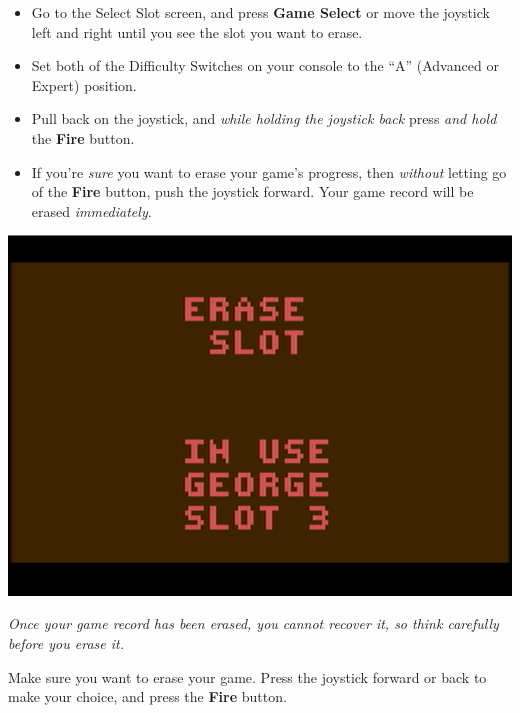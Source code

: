 \documentclass[10pt,twocolumn,openany,article]{memoir}
\newenvironment{ritemize}{\begin{itemize}\raggedright}{\end{itemize}}
\begin{document}
\begin{ritemize}
\item Go  to the Select Slot  screen, and press \textbf{Game  Select} or
  move  the joystick  left and  right until  you see  the slot  you want
  to erase.
\item Set both  of the Difficulty Switches on your  console to the ``A''
  (Advanced or Expert) position.
\item Pull  back on the  joystick, and \emph{while holding  the joystick
    back} press \emph{and hold} the \textbf{Fire} button.
\item If you're \emph{sure} you want to erase your game's progress, then
  \emph{without}  letting  go  of  the \textbf{Fire}  button,  push  the
  joystick  forward. \ifdefined\DEMO  Your  game record  will be  erased
  \emph{immediately}. \fi
\end{ritemize}

\begin{center}
  \includegraphics[width=\columnwidth]{../Manual/EraseSlotNTSC.png}
\end{center}

\ifdefined\DEMO

\emph{Once your game record has been  erased, you cannot recover it, so
  think carefully before you erase it.}

\else

Make sure  you want to  erase your game.  Press the joystick  forward or
back to make your choice, and press the \textbf{Fire} button.
\end{document}
